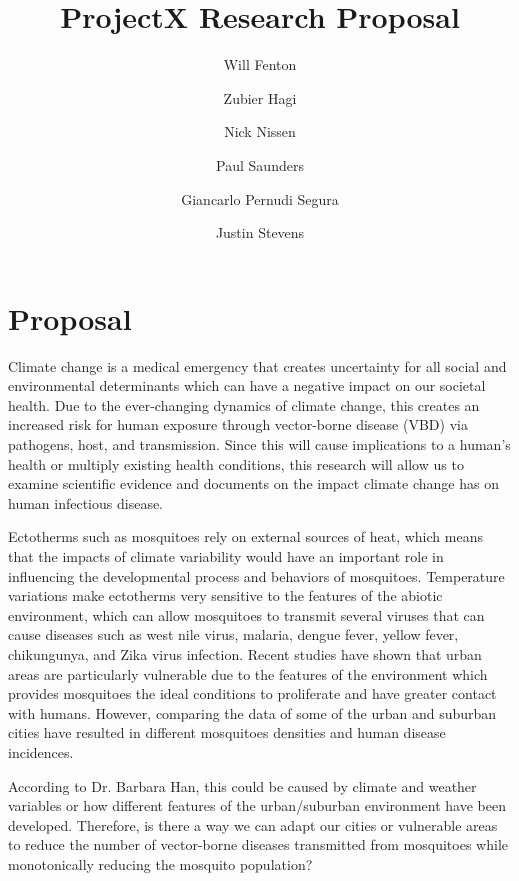 \documentclass[11pt]{article}
\title{ProjectX Research Proposal}
\author{Will Fenton}
\author{Zubier Hagi}
\author{Nick Nissen}
\author{Paul Saunders}
\author{Giancarlo Pernudi Segura}
\author{Justin Stevens}
\affil{University of Alberta}
\begin{document}
\maketitle

\section{Proposal}

Climate change is a medical emergency that creates uncertainty for all social and environmental determinants which can have a negative impact on our societal health. Due to the ever-changing dynamics of climate change, this creates an increased risk for human exposure through vector-borne disease (VBD) via pathogens, host, and transmission. Since this will cause implications to a human's health or multiply existing health conditions, this research will allow us to examine scientific evidence and documents on the impact climate change has on human infectious disease. 

Ectotherms such as mosquitoes rely on external sources of heat, which means that the impacts of climate variability would have an important role in influencing the developmental process and behaviors of mosquitoes. Temperature variations make ectotherms very sensitive to the features of the abiotic environment, which can allow mosquitoes to transmit several viruses that can cause diseases such as west nile virus, malaria, dengue fever, yellow fever, chikungunya, and Zika virus infection. Recent studies have shown that urban areas are particularly vulnerable due to the features of the environment which provides mosquitoes the ideal conditions to proliferate and have greater contact with humans. However, comparing the data of some of the urban and suburban cities have resulted in different mosquitoes densities and human disease incidences.

 According to Dr. Barbara Han, this could be caused by climate and weather variables or how different features of the urban/suburban environment have been developed. Therefore, is there a way we can adapt our cities or vulnerable areas to reduce the number of vector-borne diseases transmitted from mosquitoes while monotonically reducing the mosquito population?
\end{document}

